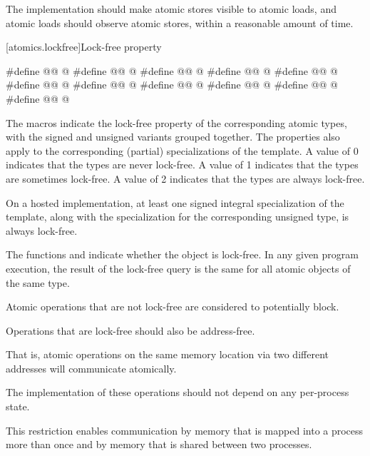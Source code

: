 \pnum
\recommended
The implementation should make atomic stores visible to atomic loads,
and atomic loads should observe atomic stores,
within a reasonable amount of time.

[atomics.lockfree]{Lock-free property}

\begin{codeblock}
#define @@ @\unspec@
#define @@ @\unspec@
#define @@ @\unspec@
#define @@ @\unspec@
#define @@ @\unspec@
#define @@ @\unspec@
#define @@ @\unspec@
#define @@ @\unspec@
#define @@ @\unspec@
#define @@ @\unspec@
#define @@ @\unspec@
\end{codeblock}

\pnum
The  macros indicate the lock-free property of the
corresponding atomic types, with the signed and unsigned variants grouped
together. The properties also apply to the corresponding (partial) specializations of the
 template. A value of 0 indicates that the types are never
lock-free. A value of 1 indicates that the types are sometimes lock-free. A
value of 2 indicates that the types are always lock-free.

\pnum
On a hosted implementation,
at least one signed integral specialization of the  template,
along with the specialization
for the corresponding unsigned type,
is always lock-free.

\pnum
The functions  and
indicate whether the object is lock-free. In any given program execution, the
result of the lock-free query
is the same for all atomic objects of the same type.

\pnum
Atomic operations that are not lock-free are considered to potentially
block.

\pnum
\recommended
Operations that are lock-free should also be address-free.
\begin{footnote}
That is,
atomic operations on the same memory location via two different addresses will
communicate atomically.
\end{footnote}
The implementation of these operations should not depend on any per-process state.
\begin{note}
This restriction enables communication by memory that is
mapped into a process more than once and by memory that is shared between two
processes.
\end{note}


